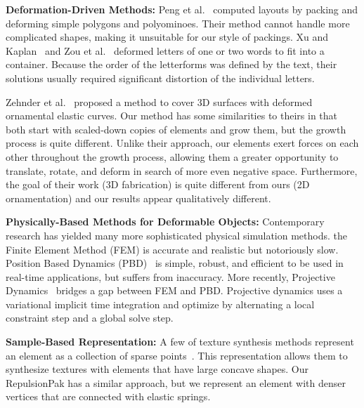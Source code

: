 \textbf{Deformation-Driven Methods:}
\newtext
{
Peng et al.~\cite{Peng2014} computed layouts by packing and deforming
simple polygons and polyominoes. Their method cannot handle more
complicated shapes, making it unsuitable for our style of packings.
Xu and Kaplan~\cite{Xu2007} and Zou et al.~\cite{Zou2016}
deformed letters of one or two words to fit into a container.
Because the order of the letterforms was defined by the text, their solutions
usually required significant distortion of the individual letters.
}

\newtext
{
Zehnder et al.~\cite{Zehnder2016} proposed a method to
cover 3D surfaces with deformed ornamental elastic curves.
Our method has some similarities to theirs in that both start with 
scaled-down copies of elements and grow them, but the growth process is quite different.  
Unlike their approach, our elements exert
forces on each other throughout the growth process, allowing them a greater
opportunity to translate, rotate, and deform in search of more even negative
space.  Furthermore, the goal of their work (3D fabrication) is quite 
different from ours (2D ornamentation) and our results appear qualitatively
different.
}






\newtext
{
\textbf{Physically-Based Methods for Deformable Objects:}
Contemporary research has yielded many more sophisticated physical simulation methods.
the Finite Element Method (FEM) is accurate and realistic but notoriously slow.
Position Based Dynamics (PBD)~\cite{Muller2007} is simple, robust, and efficient to be used in
real-time applications, but suffers from inaccuracy.
More recently, Projective Dynamics~\cite{Bouaziz2014} bridges a gap between FEM and PBD.
Projective dynamics uses a variational implicit time integration and optimize by
alternating a local constraint step and a global solve step.
}

\newtext
{
\textbf{Sample-Based Representation:}
A few of texture synthesis methods represent an element as a collection of sparse points~\cite{Ma2011, Ma2013, Hsu2020}.
This representation allows them to synthesize textures with elements
that have large concave shapes.
Our RepulsionPak has a similar approach, but we represent an element
with denser vertices that are connected with elastic springs.
}


